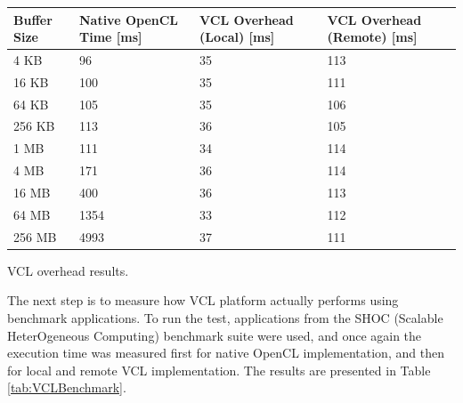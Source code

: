\begin{tablehere}
{\footnotesize
\begin{tabular}{|p{}|p{}|p{}|p{}|}\hline
\textbf{Buffer Size} & \textbf{Native OpenCL Time} [ms] & \textbf{VCL Overhead (Local)} [ms] & \textbf{VCL Overhead (Remote)} [ms]\\ \hline
4 KB & 96 & 35 & 113 \\ \hline
16 KB & 100 & 35 & 111 \\ \hline
64 KB & 105 & 35 & 106 \\ \hline
256 KB & 113 & 36 & 105 \\ \hline
1 MB & 111 & 34 & 114 \\ \hline
4 MB & 171 & 36 & 114 \\ \hline
16 MB & 400 & 36 & 113 \\ \hline
64 MB & 1354 & 33 & 112 \\ \hline
256 MB & 4993 & 37 & 111 \\ \hline
\end{tabular}}
  \caption{VCL overhead results.}
	\label{tab:VCLOverhead}
\end{tablehere}

The next step is to measure how VCL platform actually performs using benchmark applications. To run the test, applications from the SHOC (Scalable HeterOgeneous Computing) benchmark suite were used, and once again the execution time was measured first for native OpenCL implementation, and then for local and remote VCL implementation. The results are presented in Table \ref{tab:VCLBenchmark}.\\

